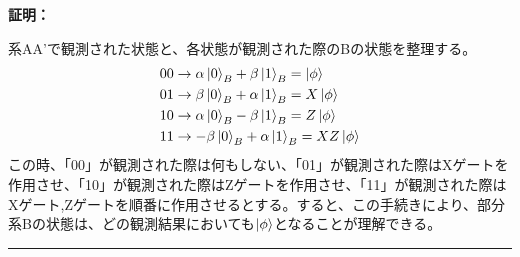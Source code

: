 \documentclass[a4paper,10.5pt]{article}
\numberwithin{equation}{section}
\newenvironment{proofbox}
{\begin{prooflabel}\textbf{証明：}\end{prooflabel}\vspace{0.8em}}
{\par\vspace{1em}\hrule\vspace{1em}}
\begin{document}
\begin{proofbox}
   系AA'で観測された状態と、各状態が観測された際のBの状態を整理する。
\begin{equation}\begin{split}
    00 &\to \alpha \ket{0}_{B}+\beta \ket{1}_{B}=\ket{\phi}\\
    01 &\to \beta \ket{0}_{B}+\alpha \ket{1}_{B}=X\ket{\phi}\\
    10 &\to \alpha \ket{0}_{B}-\beta \ket{1}_{B}=Z\ket{\phi}\\
    11 &\to -\beta \ket{0}_{B}+\alpha \ket{1}_{B}=XZ\ket{\phi}
\end{split} \end{equation}
この時、「00」が観測された際は何もしない、「01」が観測された際はXゲートを作用させ、「10」が観測された際はZゲートを作用させ、「11」が観測された際はXゲート,Zゲートを順番に作用させるとする。すると、この手続きにより、部分系Bの状態は、どの観測結果においても$\ket{\phi}$となることが理解できる。
\end{proofbox}
\end{document}
